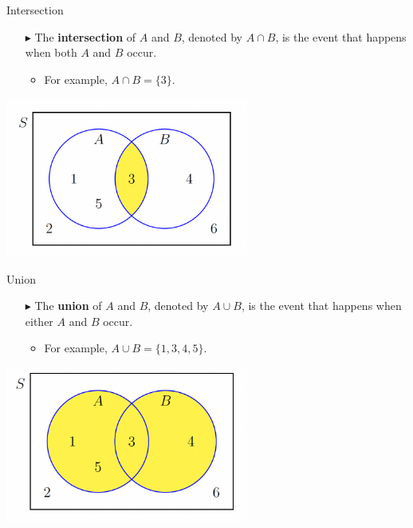 \documentclass[12pt]{beamer}
\begin{document}
\begin{frame}{Intersection}
	\begin{itemize}
		\item[$\blacktriangleright$] The {\bf intersection} of $A$ and $B$, denoted by $A\cap B$, is the event that happens when both $A$ and $B$ occur.
		\begin{itemize}
			\item For example, $A\cap B=\{3\}$.
		\end{itemize}
	\end{itemize}
	\centering
	\includegraphics[width=8cm]{venn2.png}
\end{frame}
\begin{frame}{Union}
	\begin{itemize}
		\item[$\blacktriangleright$] The {\bf union} of $A$ and $B$, denoted by $A\cup B$, is the event that happens when either $A$ and $B$ occur.
		\begin{itemize}
			\item For example, $A\cup B=\{1,3,4,5\}$.
		\end{itemize}
	\end{itemize}
	\centering
	\includegraphics[width=8cm]{venn3.png}
\end{frame}
\end{document}
